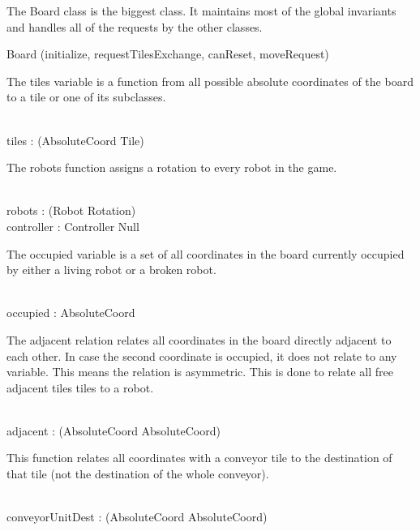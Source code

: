 The Board class is the biggest class. It maintains most of the global invariants and handles all of the requests by the other classes.
\begin{class}{Board}
\upharpoonright (initialize, requestTilesExchange, canReset, moveRequest) \\
\begin{nobottomstate}
\begin{zpar}
The tiles variable is a function from all possible absolute coordinates of the board to a tile or one of its subclasses.
\end{zpar} \\
tiles : \power (AbsoluteCoord \fun \: \downarrow \! Tile) \\
\also \also \also
\begin{zpar}
The robots function assigns a rotation to every robot in the game.
\end{zpar} \\
robots : \power (Robot \pfun Rotation) \\
\also \also \also
controller : Controller \cup Null \\
\also \also \also
\begin{zpar}
The occupied variable is a set of all coordinates in the board currently occupied by either a living robot or a broken robot.
\end{zpar} \\
occupied : \power AbsoluteCoord \\
\also \also \also
\begin{zpar}
The adjacent relation relates all coordinates in the board directly adjacent to each other. In case the second coordinate is occupied, it does not relate to any variable.
This means the relation is asymmetric. This is done to relate all free adjacent tiles tiles to a robot.
\end{zpar} \\
adjacent : \power (AbsoluteCoord \rel AbsoluteCoord) \\
\also \also \also
\begin{zpar}
This function relates all coordinates with a conveyor tile to the destination of that tile (not the destination of the whole conveyor).
\end{zpar} \\
conveyorUnitDest : \power (AbsoluteCoord \pinj AbsoluteCoord) \\
\end{nobottomstate}
\znewpage
\begin{notopstate}
\begin{zpar}

\end{zpar}
\end{notopstate}
\end{class}

